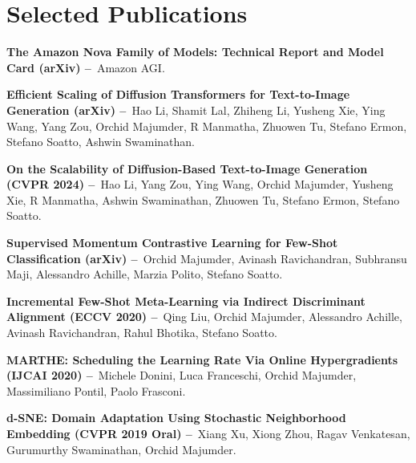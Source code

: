 \documentclass[letterpaper,11pt]{article}
\newcommand{\resumeSubHeadingListStart}{\begin{itemize}[leftmargin=0.15in, label={}]}
\newcommand{\resumeSubHeadingListEnd}{\end{itemize}}
\begin{document}
\section{Selected Publications}
  \vspace{2pt}
  \resumeSubHeadingListStart
    \small{\item{

        \textbf{The Amazon Nova Family of Models: Technical Report and Model Card (arXiv) --}{\ Amazon AGI.} \\ \vspace{3pt}

        \textbf{Efficient Scaling of Diffusion Transformers for Text-to-Image Generation (arXiv) --}{\ Hao Li, Shamit Lal, Zhiheng Li, Yusheng Xie, Ying Wang, Yang Zou, Orchid Majumder, R Manmatha, Zhuowen Tu, Stefano Ermon, Stefano Soatto, Ashwin Swaminathan.} \\ \vspace{3pt}

        \textbf{On the Scalability of Diffusion-Based Text-to-Image Generation (CVPR 2024) --}{\ Hao Li, Yang Zou, Ying Wang, Orchid Majumder, Yusheng Xie, R Manmatha, Ashwin Swaminathan, Zhuowen Tu, Stefano Ermon, Stefano Soatto.} \\ \vspace{3pt}
        
        \textbf{Supervised Momentum Contrastive Learning for Few-Shot Classification (arXiv) --}{\ Orchid Majumder, Avinash Ravichandran, Subhransu Maji, Alessandro Achille, Marzia Polito, Stefano Soatto.} \\ \vspace{3pt}

        \textbf{Incremental Few-Shot Meta-Learning via Indirect Discriminant Alignment (ECCV 2020) --}{\ Qing Liu, Orchid Majumder, Alessandro Achille, Avinash Ravichandran, Rahul Bhotika, Stefano Soatto.} \\ \vspace{3pt}

        \textbf{MARTHE: Scheduling the Learning Rate Via Online Hypergradients (IJCAI 2020) --}{\ Michele Donini, Luca Franceschi, Orchid Majumder, Massimiliano Pontil, Paolo Frasconi.} \\ \vspace{3pt}

        \textbf{d-SNE: Domain Adaptation Using Stochastic Neighborhood Embedding (CVPR 2019 Oral) --}{\ Xiang Xu, Xiong Zhou, Ragav Venkatesan, Gurumurthy Swaminathan, Orchid Majumder.} \\ \vspace{3pt}

    }}
  \resumeSubHeadingListEnd
\end{document}
